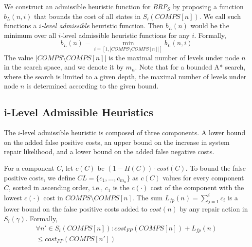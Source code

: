 \documentclass[a4paper,11pt]{report}
\newcommand{\brps}{\textit{BRP$_S$}}
\newcommand{\comps}{\textit{COMPS}}
\begin{document}
We construct an admissible heuristic function for \brps{} by proposing a function $b_L(n,i)$ that bounds the cost of all states in $S_i(\comps[n])$. We call such functions a {\em $i$-level admissible} heuristic function. Then $b_L(n)$ would be the minimum over all
$i$-level admissible heuristic functions for any $i$. Formally, 
\begin{equation}
b_L(n)=\min_{i=[1,|\comps\setminus\comps[n]|]} b_L(n,i)
\label{eq:b-admissible}
\end{equation}
The value $|\comps\setminus\comps[n]|$ is the maximal number of levels under node $n$ in the search space, and we denote it by $m_n$.  
Note that for a bounded A* search, where the search is limited to a given depth, the maximal number of levels under node $n$ is determined according to the given bound.

\subsection{i-Level Admissible Heuristics}
The $i$-level admissible heuristic is composed of three components. A lower bound on the added false positive costs, an upper bound on the increase in system repair likelihood, and a lower bound on the added false negative costs. 

For a component $C$, let $c(C)$ be $(1-H(C))\cdot cost(C)$. 
To bound the false positive costs, we define $CL=\{c_1,\ldots,c_{m_n}\}$ as $c(C)$ values for every component $C$, sorted in ascending order, i.e., $c_1$ is the $c(\cdot)$ cost of the component with the lowest $c(\cdot)$ cost in $\comps\setminus\comps[n]$.  The sum $L_{fp}(n)=\sum_{j=1}^i c_i$ is a lower bound  on the false positive costs added to $cost(n)$ by any repair action in $S_i(\gamma)$.
Formally, 
\begin{multline}
\forall n'\in S_i(\comps[n])  : cost_{FP}(\comps[n])+ L_{fp}(n) \\
\leq cost_{FP}(\comps[n'])
\label{eq:fp-bound}
\end{multline}
\end{document}
